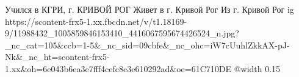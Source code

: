  
 
 
 
 

\par
Учился в КГРИ, г. КРИВОЙ РОГ
Живет в г. Кривой Рог
Из г. Кривой Рог
\ifcmt
  ig https://scontent-frx5-1.xx.fbcdn.net/v/t1.18169-9/11988432_1005859846153410_4416067595674426524_n.jpg?_nc_cat=105&ccb=1-5&_nc_sid=09cbfe&_nc_ohc=iW7cUuhlZkkAX-pJ-Nk&_nc_ht=scontent-frx5-1.xx&oh=6e043b6ea3e7fff4cefc8c3e610292ad&oe=61C710DE
  @width 0.15
\fi

